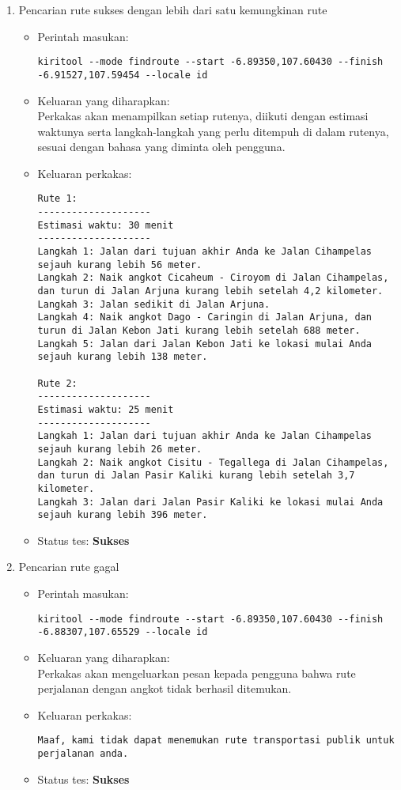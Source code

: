 \begin{enumerate}
	\item Pencarian rute sukses dengan lebih dari satu kemungkinan rute
	\begin{itemize}
		\item Perintah masukan:
		\begin{lstlisting}
kiritool --mode findroute --start -6.89350,107.60430 --finish -6.91527,107.59454 --locale id
		\end{lstlisting}
		\item Keluaran yang diharapkan: \\
		Perkakas akan menampilkan setiap rutenya, diikuti dengan estimasi waktunya serta langkah-langkah yang perlu ditempuh di dalam rutenya, sesuai dengan bahasa yang diminta oleh pengguna.
		\item Keluaran perkakas:
		\begin{lstlisting}
Rute 1:
--------------------
Estimasi waktu: 30 menit 
--------------------
Langkah 1: Jalan dari tujuan akhir Anda ke Jalan Cihampelas sejauh kurang lebih 56 meter.
Langkah 2: Naik angkot Cicaheum - Ciroyom di Jalan Cihampelas, dan turun di Jalan Arjuna kurang lebih setelah 4,2 kilometer.
Langkah 3: Jalan sedikit di Jalan Arjuna.
Langkah 4: Naik angkot Dago - Caringin di Jalan Arjuna, dan turun di Jalan Kebon Jati kurang lebih setelah 688 meter.
Langkah 5: Jalan dari Jalan Kebon Jati ke lokasi mulai Anda sejauh kurang lebih 138 meter.

Rute 2:
--------------------
Estimasi waktu: 25 menit 
--------------------
Langkah 1: Jalan dari tujuan akhir Anda ke Jalan Cihampelas sejauh kurang lebih 26 meter.
Langkah 2: Naik angkot Cisitu - Tegallega di Jalan Cihampelas, dan turun di Jalan Pasir Kaliki kurang lebih setelah 3,7 kilometer.
Langkah 3: Jalan dari Jalan Pasir Kaliki ke lokasi mulai Anda sejauh kurang lebih 396 meter.
		\end{lstlisting}
		\item Status tes: \textbf{Sukses}
	\end{itemize}
	
	\item Pencarian rute gagal
	\begin{itemize}
		\item Perintah masukan:
		\begin{lstlisting}
kiritool --mode findroute --start -6.89350,107.60430 --finish -6.88307,107.65529 --locale id
		\end{lstlisting}
		\item Keluaran yang diharapkan: \\
		Perkakas akan mengeluarkan pesan kepada pengguna bahwa rute perjalanan dengan angkot tidak berhasil ditemukan.
		\item Keluaran perkakas:
		\begin{lstlisting}
Maaf, kami tidak dapat menemukan rute transportasi publik untuk perjalanan anda.
		\end{lstlisting}
		\item Status tes: \textbf{Sukses}
	\end{itemize}
	

\end{enumerate}

